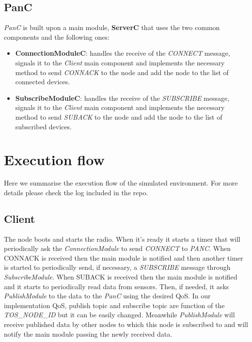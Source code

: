 \documentclass[10pt]{article}
\begin{document}
\subsection{PanC}
\emph{PanC} is built upon a main module, \textbf{ServerC} that uses the two common components and the following ones:
\begin{itemize}
\item \textbf{ConnectionModuleC}: handles the receive of the \emph{CONNECT} message, signals it to the \emph{Client} main component and implements the necessary method to send \emph{CONNACK} to the node and add the node to the list of connected devices. 
\item \textbf{SubscribeModuleC}: handles the receive of the \emph{SUBSCRIBE} message, signals it to the \emph{Client} main component and implements the necessary method to send \emph{SUBACK} to the node and add the node to the list of subscribed devices. 
\end{itemize}

\section{Execution flow}
Here we summarise the execution flow of the simulated environment. For more details please check the log included in the repo.
\subsection{Client}
The node boots and starts the radio. When it's ready it starts a timer that will periodically ask the \emph{ConnectionModule} to send \emph{CONNECT} to \emph{PANC}. When {CONNACK} is received then the main module is notified and then another timer is started to periodically send, if necessary, a \emph{SUBSCRIBE} message through \emph{SubscribeModule}. When {SUBACK} is received then the main module is notified and it starts to periodically read data from sensors. Then, if needed, it asks \emph{PublishModule} to the data to the \emph{PanC} using the desired QoS. In our implementation QoS, publish topic and subscribe topic are function of the \emph{TOS\_NODE\_ID} but it can be easily changed. Meanwhile \emph{PublishModule} will receive published data by other nodes to which this node is subscribed to and will notify the main module passing the newly received data.
\end{document}
